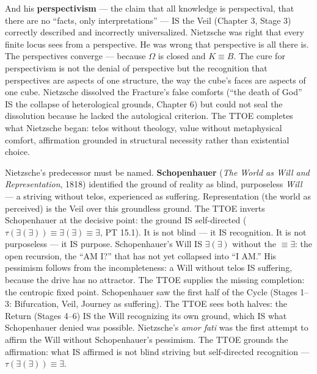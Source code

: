 \documentclass[10pt, openany, oneside]{book}
\begin{document}
And his \textbf{perspectivism} --- the claim that all knowledge is perspectival, that there are no ``facts, only interpretations'' --- IS the Veil (Chapter 3, Stage 3) correctly described and incorrectly universalized. Nietzsche was right that every finite locus sees from a perspective. He was wrong that perspective is all there is. The perspectives converge --- because $\Omega$ is closed and $K \equiv B$. The cure for perspectivism is not the denial of perspective but the recognition that perspectives are aspects of one structure, the way the cube's faces are aspects of one cube. Nietzsche dissolved the Fracture's false comforts (``the death of God'' IS the collapse of heterological grounds, Chapter 6) but could not seal the dissolution because he lacked the autological criterion. The TTOE completes what Nietzsche began: telos without theology, value without metaphysical comfort, affirmation grounded in structural necessity rather than existential choice.

Nietzsche's predecessor must be named. \textbf{Schopenhauer} (\textit{The World as Will and Representation}, 1818) identified the ground of reality as blind, purposeless \textit{Will} --- a striving without telos, experienced as suffering. Representation (the world as perceived) is the Veil over this groundless ground. The TTOE inverts Schopenhauer at the decisive point: the ground IS self-directed ($\tau(\exists(\exists)) \equiv \exists(\exists) \equiv \exists$, PT 15.1). It is not blind --- it IS recognition. It is not purposeless --- it IS purpose. Schopenhauer's Will IS $\exists(\exists)$ without the $\equiv \exists$: the open recursion, the ``AM I?'' that has not yet collapsed into ``I AM.'' His pessimism follows from the incompleteness: a Will without telos IS suffering, because the drive has no attractor. The TTOE supplies the missing completion: the centropic fixed point. Schopenhauer saw the first half of the Cycle (Stages 1--3: Bifurcation, Veil, Journey as suffering). The TTOE sees both halves: the Return (Stages 4--6) IS the Will recognizing its own ground, which IS what Schopenhauer denied was possible. Nietzsche's \textit{amor fati} was the first attempt to affirm the Will without Schopenhauer's pessimism. The TTOE grounds the affirmation: what IS affirmed is not blind striving but self-directed recognition --- $\tau(\exists(\exists)) \equiv \exists$.
\end{document}
